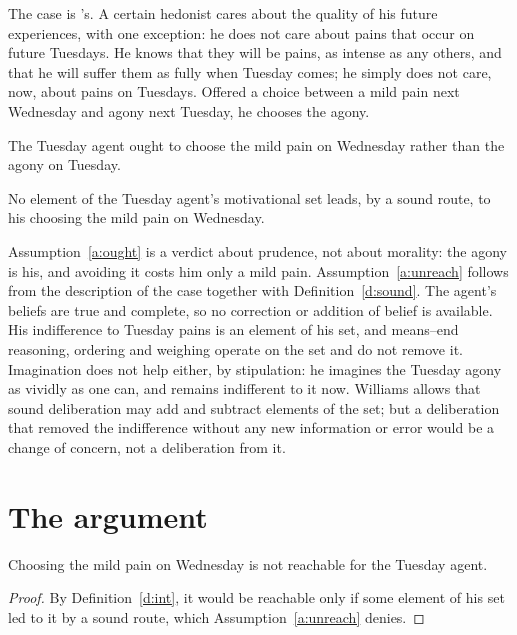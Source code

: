 \documentclass{situationist-preprint}
\begin{document}
The case is \citet{Parfit1984}'s. A certain hedonist cares about the quality of his future experiences, with one exception: he does not care about pains that occur on future Tuesdays. He knows that they will be pains, as intense as any others, and that he will suffer them as fully when Tuesday comes; he simply does not care, now, about pains on Tuesdays. Offered a choice between a mild pain next Wednesday and agony next Tuesday, he chooses the agony.

\begin{assumption}\label{a:ought}
The Tuesday agent ought to choose the mild pain on Wednesday rather than the agony on Tuesday.
\end{assumption}

\begin{assumption}\label{a:unreach}
No element of the Tuesday agent's motivational set leads, by a sound route, to his choosing the mild pain on Wednesday.
\end{assumption}

Assumption~\ref{a:ought} is a verdict about prudence, not about morality: the agony is his, and avoiding it costs him only a mild pain. Assumption~\ref{a:unreach} follows from the description of the case together with Definition~\ref{d:sound}. The agent's beliefs are true and complete, so no correction or addition of belief is available. His indifference to Tuesday pains is an element of his set, and means--end reasoning, ordering and weighing operate on the set and do not remove it. Imagination does not help either, by stipulation: he imagines the Tuesday agony as vividly as one can, and remains indifferent to it now. Williams allows that sound deliberation may add and subtract elements of the set; but a deliberation that removed the indifference without any new information or error would be a change of concern, not a deliberation from it.

\section{The argument}

\begin{lemma}\label{l:unreach}
Choosing the mild pain on Wednesday is not reachable for the Tuesday agent.
\end{lemma}

\begin{proof}
By Definition~\ref{d:int}, it would be reachable only if some element of his set led to it by a sound route, which Assumption~\ref{a:unreach} denies.
\end{proof}
\end{document}
